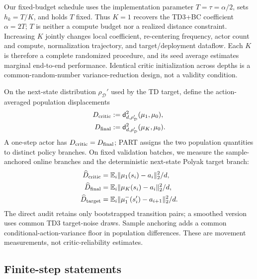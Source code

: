 \documentclass[twoside]{article}
\begin{document}
Our fixed-budget schedule uses the implementation parameter
$T=\tau=\alpha/2$, sets $h_k=T/K$, and holds $T$ fixed. Thus $K=1$ recovers
the TD3+BC coefficient $\alpha=2T$; $T$ is neither a compute budget nor a
realized distance constraint. Increasing $K$ jointly changes local coefficient,
re-centering frequency, actor count and compute, normalization trajectory, and
target/deployment dataflow. Each $K$ is therefore a complete randomized
procedure, and its seed average estimates marginal end-to-end performance.
Identical critic initialization across depths is a common-random-number
variance-reduction design, not a validity condition.

On the next-state distribution $\rho_{\mathcal D}'$ used by the TD target,
define the action-averaged population displacements
\begin{equation}
\begin{aligned}
D_{\rm critic}&:=\mathsf d_{d,\rho_{\mathcal D}'}^2(\mu_1,\mu_0),\\
D_{\rm final}&:=\mathsf d_{d,\rho_{\mathcal D}'}^2(\mu_K,\mu_0).
\end{aligned}
\label{eq:displacements}
\end{equation}
A one-step actor has $D_{\rm critic}=D_{\rm final}$; PART assigns the two
population quantities to distinct policy branches. On fixed validation batches, we measure the sample-anchored online branches
and the deterministic next-state Polyak target branch:
\begin{equation}
\begin{aligned}
\widehat D_{\rm critic}&=\mathbb E_i\|\mu_1(s_i)-a_i\|_2^2/d,\\
\widehat D_{\rm final}&=\mathbb E_i\|\mu_K(s_i)-a_i\|_2^2/d,\\
\widehat D_{\rm target}&=\mathbb E_i\|\mu_1^-(s_i')-a_{i+1}\|_2^2/d.
\end{aligned}
\label{eq:direct_target_displacement}
\end{equation}
The direct audit retains only bootstrapped transition pairs; a smoothed version
uses common TD3 target-noise draws. Sample anchoring adds a common
conditional-action-variance floor in population differences. These are
movement measurements, not critic-reliability estimates.

\subsection{Finite-step statements}
\end{document}
